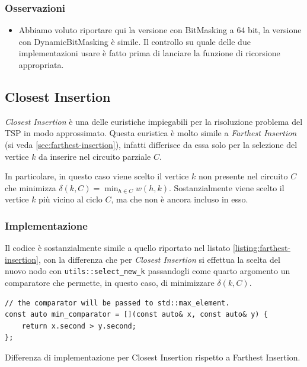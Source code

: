 \subsubsection{Osservazioni}

\begin{itemize}
    \item Abbiamo voluto riportare qui la versione con BitMasking a 64 bit, la versione con DynamicBitMasking è simile. Il controllo su quale delle due implementazioni usare è fatto prima di lanciare la funzione di ricorsione appropriata.\\
\end{itemize}

\newpage

\subsection{Closest Insertion}
\label{sec:closest-insertion}

\emph{Closest Insertion} è una delle euristiche impiegabili per la
risoluzione problema del TSP in modo approssimato. Questa euristica
è molto simile a \emph{Farthest Insertion} (si veda \ref{sec:farthest-insertion}),
infatti differisce da essa solo per la selezione del vertice $k$
da inserire nel circuito parziale $C$.

In particolare, in questo caso viene scelto il vertice $k$ non presente
nel circuito $C$ che minimizza $\delta (k, C) = \min_{h \in C} w(h, k)$.
Sostanzialmente viene scelto il vertice $k$ più vicino al ciclo $C$,
ma che non è ancora incluso in esso.

\subsubsection{Implementazione}

Il codice è sostanzialmente simile a quello riportato nel listato
\ref{listing:farthest-insertion}, con la differenza che per
\emph{Closest Insertion} si effettua la scelta del nuovo nodo
con \texttt{utils::select_new_k} passandogli come quarto
argomento un comparatore che permette, in questo caso, di
minimizzare $\delta (k, C)$.

\begin{listing}[!ht]
\begin{verbatim}
// the comparator will be passed to std::max_element.
const auto min_comparator = [](const auto& x, const auto& y) {
    return x.second > y.second;
};
\end{verbatim}
\caption{Differenza di implementazione per Closest Insertion rispetto a Farthest Insertion.}
\label{listing:closest-insertion-diff}
\end{listing}

